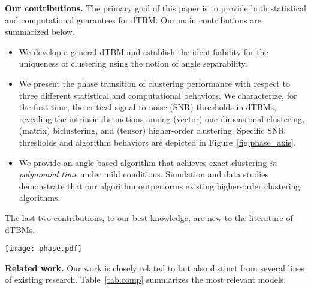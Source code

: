 \documentclass[lettersize,onecolumn,journal]{IEEEtran}
\theoremstyle{definition}
\theoremstyle{definition}
\begin{document}
{\bf Our contributions.} The primary goal of this paper is to provide both statistical and computational guarantees for dTBM. Our main contributions are summarized below.
\begin{itemize}[leftmargin=*]

 \item We develop a general dTBM and establish the identifiability for the uniqueness of clustering using the notion of angle separability.
 
\item  We present the phase transition of clustering performance with respect to three different statistical and computational behaviors.  We characterize, for the first time, the critical signal-to-noise (SNR) thresholds in dTBMs, revealing the intrinsic distinctions among (vector) one-dimensional clustering, (matrix) biclustering, and (tensor) higher-order clustering. Specific SNR thresholds and algorithm behaviors are depicted in  Figure~\ref{fig:phase_axis}. 
        
 \item We provide an angle-based algorithm that achieves exact clustering \emph{in polynomial time} under mild conditions. Simulation and data studies demonstrate that our algorithm outperforms existing higher-order clustering algorithms. 
\end{itemize}
The last two contributions, to our best knowledge, are new to the literature of dTBMs. 



\begin{figure*}[t]
    \centering
    \texttt{[image: phase.pdf]}
    \caption{SNR thresholds for statistical and computational limits in order-$K$ dTBM with dimension $(p,...,p)$ and $K \geq 2$. The SNR gap between statistical possibility and computational efficiency  exists only for tensors with $K \geq 3$. }
    \label{fig:phase_axis}
\end{figure*}




{\bf Related work.} 
Our work is closely related to but also distinct from several lines of existing research. Table~\ref{tab:comp} summarizes the most relevant models. 
\end{document}
